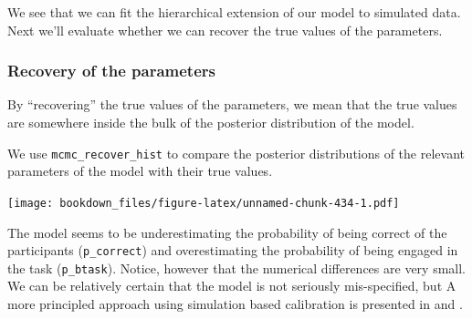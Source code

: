 \documentclass[12pt,]{krantz}
\newenvironment{Shaded}{\begin{snugshade}}{\end{snugshade}}
\newcommand{\KeywordTok}[1]{\textcolor[rgb]{0.13,0.29,0.53}{\textbf{#1}}}
\newcommand{\DecValTok}[1]{\textcolor[rgb]{0.00,0.00,0.81}{#1}}
\newcommand{\StringTok}[1]{\textcolor[rgb]{0.31,0.60,0.02}{#1}}
\newcommand{\OperatorTok}[1]{\textcolor[rgb]{0.81,0.36,0.00}{\textbf{#1}}}
\newcommand{\NormalTok}[1]{#1}
\theoremstyle{definition}
\theoremstyle{definition}
\theoremstyle{definition}
\theoremstyle{remark}
\begin{document}
We see that we can fit the hierarchical extension of our model to
simulated data. Next we'll evaluate whether we can recover the true
values of the parameters.

\subsubsection{Recovery of the
parameters}\label{recovery-of-the-parameters}

By ``recovering'' the true values of the parameters, we mean that the
true values are somewhere inside the bulk of the posterior distribution
of the model.

We use \texttt{mcmc\_recover\_hist} to compare the posterior
distributions of the relevant parameters of the model with their true
values.

\begin{Shaded}
\end{Shaded}

\texttt{[image: bookdown\_files/figure-latex/unnamed-chunk-434-1.pdf]}

The model seems to be underestimating the probability of being correct
of the participants (\texttt{p\_correct}) and overestimating the
probability of being engaged in the task (\texttt{p\_btask}). Notice,
however that the numerical differences are very small. We can be
relatively certain that the model is not seriously mis-specified, but A
more principled approach using simulation based calibration is presented
in \citet{talts2018validating} and \citet{schad2020toward}.
\end{document}

